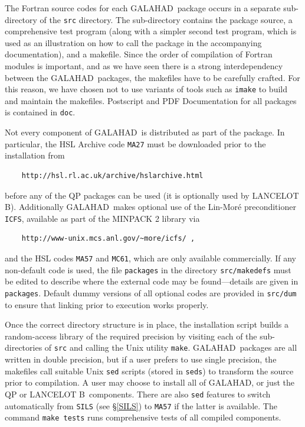\documentclass[acmtocl,acmnow]{acmtrans2m}
\newcommand{\gal}{{\sf GALAHAD}}
\newcommand{\lanb}{{\sf LANCELOT B}}
\begin{document}
The Fortran source codes for each \gal\ package occurs 
in a separate sub-directory of the {\tt src} directory. The sub-directory
contains the package source, a comprehensive test program (along with
a simpler second test program, which is used as an illustration on how
to call the package in the accompanying documentation), and a makefile.
Since the order of compilation of Fortran modules is important, and as
we have seen there is a strong interdependency between the \gal\ packages,
the makefiles have to be carefully crafted. For this reason, 
we have chosen not to use variants of tools such as 
{\tt imake} to build and
maintain the makefiles. Postscript and PDF Documentation for all packages
is contained in {\tt doc}.

Not every component of \gal\ is distributed as part of the package. In
particular, the HSL Archive code {\tt MA27} must be downloaded prior to 
the installation from
\begin{verbatim}
    http://hsl.rl.ac.uk/archive/hslarchive.html 
\end{verbatim}
before any of the QP packages can be used (it is optionally used by \lanb).
Additionally \gal\ makes optional use of the 
Lin-Mor\'{e} preconditioner {\tt ICFS}, available as
part of the MINPACK 2 library via
\begin{verbatim}
    http://www-unix.mcs.anl.gov/~more/icfs/ ,
\end{verbatim}
and the HSL codes {\tt MA57} and {\tt MC61}, which are only available
commercially. If any non-default code is used, the file {\tt packages}
in the directory {\tt src/makedefs} must be edited to describe where
the external code may be found---details are given in {\tt packages}.
Default dummy versions of all optional codes are provided in 
{\tt src/dum} to ensure that linking prior to execution works properly.

Once the correct directory structure is in place, the installation script
builds a random-access library of the required precision by visiting each 
of the sub-directories of {\tt src} and calling the Unix utility {\tt make}.
\gal\ packages are all written in double precision, but if a user prefers to
use single precision, the makefiles call suitable Unix {\tt sed} 
scripts (stored in {\tt seds}) to transform the source prior to compilation.
A user may choose to install all of \gal, or just the QP or \lanb\ components.
There are also {\tt sed} features to switch automatically from {\tt SILS} (see
 \S\ref{SILS}) to {\tt MA57} if the latter is available.
The command {\tt make tests} runs comprehensive tests of all 
compiled components.
\end{document}

